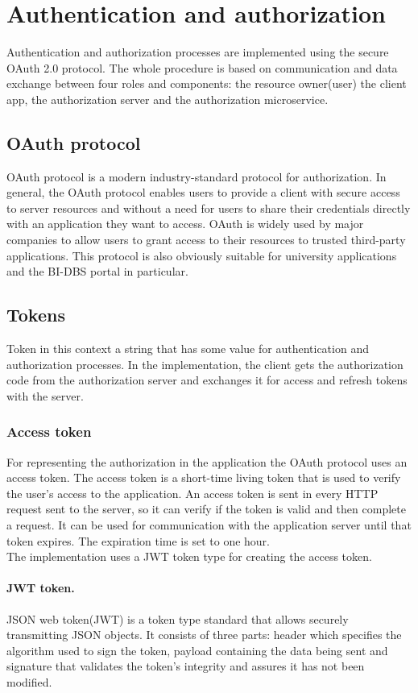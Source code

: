 \section{Authentication and authorization}
Authentication and authorization processes are implemented using the secure OAuth 2.0 protocol. The whole procedure is based on communication and data exchange between four roles and components: the resource owner(user) the client app, the authorization server and the authorization microservice.

\subsection{OAuth protocol}
OAuth protocol is a modern industry-standard protocol for authorization. 
In general, the OAuth protocol enables users to provide a client with secure access to server resources and without a need for users to share their credentials directly with an application they want to access. OAuth is widely used by major companies to allow users to grant access to their resources to trusted third-party applications. This protocol is also obviously suitable for university applications and the BI-DBS portal in particular.

\subsection{Tokens} Token in this context a string that has some value for authentication and authorization processes. In the implementation, the client gets the authorization code from the authorization server and exchanges it for access and refresh tokens with the server. 

\subsubsection{Access token}
For representing the authorization in the application the OAuth protocol uses an access token. The access token is a short-time living token that is used to verify the user's access to the application. An access token is sent in every HTTP request sent to the server, so it can verify if the token is valid and then complete a request. It can be used for communication with the application server until that token expires. The expiration time is set to one hour.\\ 
The implementation uses a JWT token type for creating the access token. 
 
\paragraph*{JWT token.} JSON web token(JWT) is a token type standard that allows securely transmitting JSON objects. It consists of three parts: header which specifies the algorithm used to sign the token, payload containing the data being sent and signature that validates the token's integrity and assures it has not been modified.


